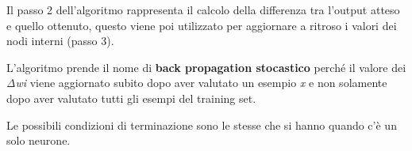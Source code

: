 Il passo 2 dell'algoritmo rappresenta il calcolo della differenza tra
l'output atteso e quello ottenuto, questo viene poi utilizzato per
aggiornare a ritroso i valori dei nodi interni (passo 3).

L'algoritmo prende il nome di \textbf{back propagation stocastico}
perché il valore dei \emph{Δwi} viene aggiornato subito dopo aver
valutato un esempio \emph{x} e non solamente dopo aver valutato tutti
gli esempi del training set.

Le possibili condizioni di terminazione sono le stesse che si hanno
quando c'è un solo neurone.
